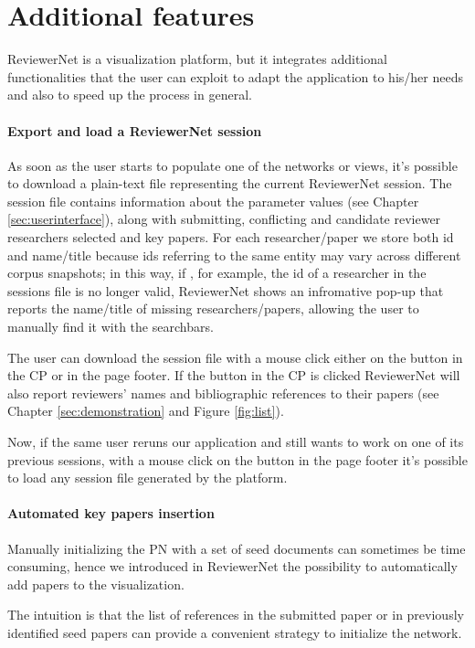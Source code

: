 \section{Additional features}\label{sec:misccode}
ReviewerNet is a visualization platform, but it integrates additional functionalities that the user can exploit to adapt the application to his/her needs and also to speed up the process in general.

\paragraph*{Export and load a ReviewerNet session}
As soon as the user starts to populate one of the networks or views, it's possible to download a plain-text file representing the current ReviewerNet session. The session file contains information about the parameter values (see Chapter \ref{sec:userinterface}), along with submitting, conflicting and candidate reviewer researchers selected and key papers. For each researcher/paper we store both id and name/title because ids referring to the same entity may vary across different corpus snapshots; in this way, if , for example, the id of a researcher in the sessions file is no longer valid, ReviewerNet shows an infromative pop-up that reports the name/title of missing researchers/papers, allowing the user to manually find it with the searchbars.     

The user can download the session file with a mouse click either on the  button in the CP or in the page footer. If the button in the CP is clicked ReviewerNet will also report reviewers’ names and bibliographic references to their papers (see Chapter \ref{sec:demonstration} and Figure \ref{fig:list}).

Now, if the same user reruns our application and still wants to work on one of its previous sessions, with a mouse click on the  button in the page footer it's possible to load any session file generated by the platform.

\paragraph*{Automated key papers insertion}
Manually initializing the PN with a set of seed documents can sometimes be time consuming, hence we introduced in ReviewerNet the possibility to automatically add papers to the visualization. 

The intuition is that the list of references in the submitted paper or in previously identified seed papers can provide a convenient strategy to initialize the network.

